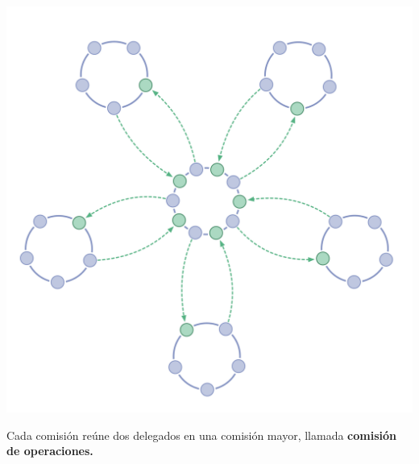 \documentclass[justified]{tufte-handout} %
\begin{document}
\begin{marginfigure}[-200px]
	\includegraphics[width=\linewidth]{jerarquia.png}
	\caption{Cada comisión reúne dos delegados en una comisión mayor, llamada \textbf{comisión de operaciones.}}
	\label{fig:jerarquia}
\end{marginfigure}





\end{document}
